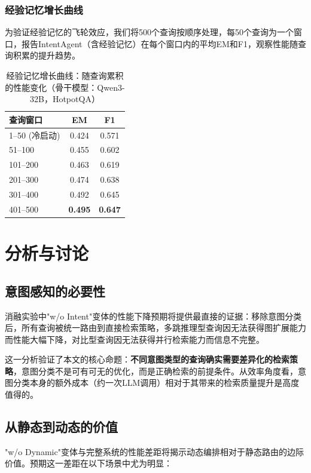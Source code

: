 \documentclass[runningheads]{llncs}
\begin{document}
\subsubsection{经验记忆增长曲线}

为验证经验记忆的飞轮效应，我们将500个查询按顺序处理，每50个查询为一个窗口，报告IntentAgent（含经验记忆）在每个窗口内的平均EM和F1，观察性能随查询积累的提升趋势。

\begin{table}[htbp]
\centering
\caption{经验记忆增长曲线：随查询累积的性能变化（骨干模型：Qwen3-32B，HotpotQA）}
\label{tab:memory_growth}
\begin{tabular}{l|cc}
\toprule
\textbf{查询窗口} & \textbf{EM} & \textbf{F1} \\
\midrule
1--50 (冷启动) & 0.424 & 0.571 \\
51--100 & 0.455 & 0.602 \\
101--200 & 0.463 & 0.619 \\
201--300 & 0.474 & 0.638 \\
301--400 & 0.492 & 0.645 \\
401--500 & \textbf{0.495} & \textbf{0.647} \\
\bottomrule
\end{tabular}
\end{table}

\section{分析与讨论}

\subsection{意图感知的必要性}

消融实验中"w/o Intent"变体的性能下降预期将提供最直接的证据：移除意图分类后，所有查询被统一路由到直接检索策略，多跳推理型查询因无法获得图扩展能力而性能大幅下降，对比型查询因无法获得并行检索能力而信息不完整。

这一分析验证了本文的核心命题：\textbf{不同意图类型的查询确实需要差异化的检索策略}，意图分类不是可有可无的优化，而是正确检索的前提条件。从效率角度看，意图分类本身的额外成本（约一次LLM调用）相对于其带来的检索质量提升是高度值得的。

\subsection{从静态到动态的价值}

"w/o Dynamic"变体与完整系统的性能差距将揭示动态编排相对于静态路由的边际价值。预期这一差距在以下场景中尤为明显：
\end{document}
